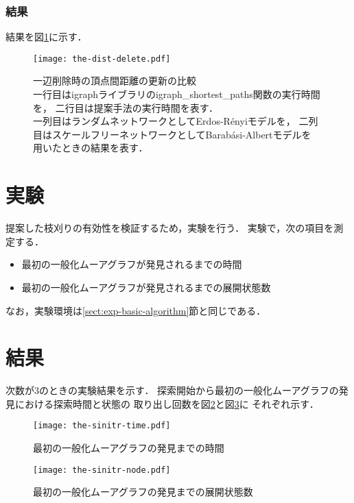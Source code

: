\subsubsection*{結果}
結果を図\ref{fig:the-dist-delete}に示す．
\begin{figure}
  \centering
  \texttt{[image: the-dist-delete.pdf]}
  \caption{一辺削除時の頂点間距離の更新の比較 \\
      一行目はigraphライブラリのigraph\_shortest\_paths関数の実行時間を，
      二行目は提案手法の実行時間を表す．\\
      一列目はランダムネットワークとしてErdos-R{\'e}nyiモデルを，
      二列目はスケールフリーネットワークとしてBarab{\'a}si-Albertモデルを
      用いたときの結果を表す．}
  \label{fig:the-dist-delete}
\end{figure}

\section{実験}
\label{sect:exp-reduce-by-initial}
提案した枝刈りの有効性を検証するため，実験を行う．
実験で，次の項目を測定する．
\begin{itemize}
\item 最初の一般化ムーアグラフが発見されるまでの時間
\item 最初の一般化ムーアグラフが発見されるまでの展開状態数
\end{itemize}
なお，実験環境は\ref{sect:exp-basic-algorithm}節と同じである．

\section{結果}
次数が3のときの実験結果を示す．
探索開始から最初の一般化ムーアグラフの発見における探索時間と状態の
取り出し回数を図\ref{fig:sinitr-time}と図\ref{fig:sinitr-node}に
それぞれ示す．

\begin{figure}
  \centering
  \texttt{[image: the-sinitr-time.pdf]}
  \caption{最初の一般化ムーアグラフの発見までの時間}
  \label{fig:sinitr-time}
\end{figure}
\begin{figure}
  \centering
  \texttt{[image: the-sinitr-node.pdf]}
  \caption{最初の一般化ムーアグラフの発見までの展開状態数}
  \label{fig:sinitr-node}
\end{figure}
